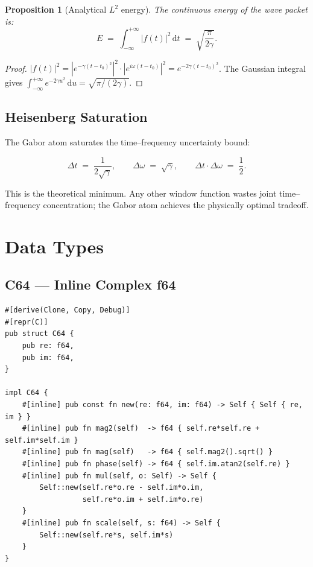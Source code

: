 \documentclass[11pt,a4paper]{article}
\newtheorem{proposition}[theorem]{Proposition}
\theoremstyle{definition}
\begin{document}
\begin{proposition}[Analytical $L^2$ energy]
  \label{prop:energy}
  The continuous energy of the wave packet is:
  \begin{equation}
    E
    \;=\; \int_{-\infty}^{+\infty} |f(t)|^2\,\mathrm{d}t
    \;=\; \sqrt{\dfrac{\pi}{2\gamma}}.
    \label{eq:energy_analytical}
  \end{equation}
\end{proposition}

\begin{proof}
  $|f(t)|^2 = |e^{-\gamma(t-t_0)^2}|^2 \cdot |e^{i\omega(t-t_0)}|^2
  = e^{-2\gamma(t-t_0)^2}$.
  The Gaussian integral gives
  $\int_{-\infty}^{+\infty} e^{-2\gamma u^2}\,\mathrm{d}u
  = \sqrt{\pi/(2\gamma)}$.
\end{proof}

\subsection{Heisenberg Saturation}

The Gabor atom saturates the time--frequency uncertainty bound:

\begin{equation}
  \Delta t \;=\; \frac{1}{2\sqrt{\gamma}},
  \qquad
  \Delta\omega \;=\; \sqrt{\gamma},
  \qquad
  \Delta t \cdot \Delta\omega \;=\; \frac{1}{2}.
\end{equation}

This is the theoretical minimum. Any other window function wastes
joint time--frequency concentration; the Gabor atom achieves the
physically optimal tradeoff.

\section{Data Types}
\label{sec:types}

\subsection{C64 --- Inline Complex f64}

\begin{lstlisting}[caption={C64: inline complex number, no external crate},label={lst:c64}]
#[derive(Clone, Copy, Debug)]
#[repr(C)]
pub struct C64 {
    pub re: f64,
    pub im: f64,
}

impl C64 {
    #[inline] pub const fn new(re: f64, im: f64) -> Self { Self { re, im } }
    #[inline] pub fn mag2(self)  -> f64 { self.re*self.re + self.im*self.im }
    #[inline] pub fn mag(self)   -> f64 { self.mag2().sqrt() }
    #[inline] pub fn phase(self) -> f64 { self.im.atan2(self.re) }
    #[inline] pub fn mul(self, o: Self) -> Self {
        Self::new(self.re*o.re - self.im*o.im,
                  self.re*o.im + self.im*o.re)
    }
    #[inline] pub fn scale(self, s: f64) -> Self {
        Self::new(self.re*s, self.im*s)
    }
}
\end{lstlisting}
\end{document}
